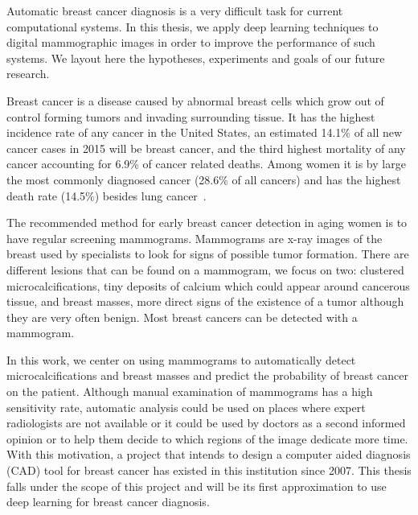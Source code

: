 \begin{comment} 
Hook(first paragarpah) : Automatic breast cancer diagnosis is a very difficult taks for current automatic computationnal systems. In this article,  we apply deep learning techniques to digital mammogrpahic images and obtain better results than presented to date. We show or prove or use this technique to obtain this... (when we have results)
\end{comment}
Automatic breast cancer diagnosis is a very difficult task for current computational systems. In this thesis, we apply deep learning techniques to digital mammographic images in order to improve the performance of such systems. We layout here the hypotheses, experiments and goals of our future research.

Breast cancer is a disease caused by abnormal breast cells which grow out of control forming tumors and invading surrounding tissue.
It has the highest incidence rate of any cancer in the United States, an estimated 14.1\% of all new cancer cases in 2015 will be breast cancer, and the third highest mortality of any cancer accounting for 6.9\% of cancer related deaths. Among women it is by large the most commonly diagnosed cancer (28.6\% of all cancers) and has the highest death rate (14.5\%) besides lung cancer~\cite{ACS2015}.

The recommended method for early breast cancer detection in aging women is to have regular screening mammograms. Mammograms are x-ray images of the breast used by specialists to look for signs of possible tumor formation. There are different lesions that can be found on a mammogram, we focus on two: clustered microcalcifications, tiny deposits of calcium which could appear around cancerous tissue, and breast masses, more direct signs of the existence of a tumor although they are very often benign. Most breast cancers can be detected with a mammogram.%

In this work, we center on using mammograms to automatically detect microcalcifications and breast masses and predict the probability of breast cancer on the patient. Although manual examination of mammograms has a high sensitivity rate, automatic analysis could be used on places where expert radiologists are not available or it could be used by doctors as a second informed opinion or to help them decide to which regions of the image dedicate more time. With this motivation, a project that intends to design a computer aided diagnosis (CAD) tool for breast cancer has existed in this institution since 2007. This thesis falls under the scope of this project and will be its first approximation to use deep learning for breast cancer diagnosis.

